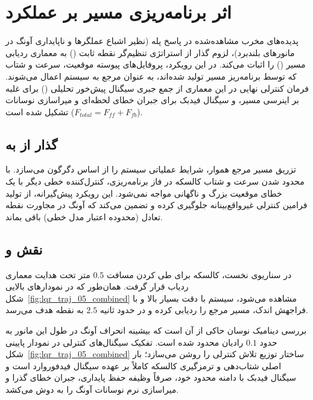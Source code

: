 
\section{اثر برنامه‌ریزی مسیر بر عملکرد }
\label{sec:lqr_traj_analysis}

پدیده‌های مخرب مشاهده‌شده در پاسخ پله (نظیر اشباع عملگرها و ناپایداری آونگ در مانورهای بلندبرد)، لزوم گذار از استراتژی تنظیم‌گر نقطه ثابت () به معماری ردیابی مسیر () را اثبات می‌کند. در این رویکرد، پروفایل‌های پیوسته موقعیت، سرعت و شتاب که توسط برنامه‌ریز مسیر تولید شده‌اند، به عنوان مرجع به سیستم اعمال می‌شوند. فرمان کنترلی نهایی در این معماری از جمع جبری سیگنال پیش‌خور تحلیلی () برای غلبه بر اینرسی مسیر، و سیگنال فیدبک  برای جبران خطای لحظه‌ای و میراسازی نوسانات تشکیل شده است ($F_{total} = F_{ff} + F_{fb}$).

\subsection{گذار از  به }
تزریق مسیر مرجع هموار، شرایط عملیاتی سیستم را از اساس دگرگون می‌سازد. با محدود شدن سرعت و شتاب کالسکه در فاز برنامه‌ریزی، کنترل‌کننده خطی دیگر با یک خطای موقعیت بزرگ و ناگهانی مواجه نمی‌شود. این رویکرد پیش‌گیرانه، از تولید فرامین کنترلی غیرواقع‌بینانه جلوگیری کرده و تضمین می‌کند که آونگ در مجاورت نقطه تعادل (محدوده اعتبار مدل خطی) باقی بماند.

\subsection{نقش  و }
در سناریوی نخست، کالسکه برای طی کردن مسافت $0.5$ متر تحت هدایت معماری ردیاب قرار گرفت. همان‌طور که در نمودارهای بالایی شکل~\ref{fig:lqr_traj_05_combined} مشاهده می‌شود، سیستم با دقت بسیار بالا و با فراجهش اندک، مسیر مرجع را ردیابی کرده و در حدود ثانیه $2.5$ به نقطه هدف می‌رسد.

بررسی دینامیک نوسان حاکی از آن است که بیشینه انحراف آونگ در طول این مانور به حدود $0.1$ رادیان محدود شده است. تفکیک سیگنال‌های کنترلی در نمودار پایینی شکل~\ref{fig:lqr_traj_05_combined} ساختار توزیع تلاش کنترلی را روشن می‌سازد؛ بار اصلی شتاب‌دهی و ترمزگیری کالسکه کاملاً بر عهده سیگنال فیدفوروارد است و سیگنال فیدبک  با دامنه محدود خود، صرفاً وظیفه حفظ پایداری، جبران خطای گذرا و میراسازی نرم نوسانات آونگ را به دوش می‌کشد.


